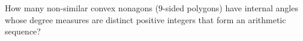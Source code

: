 How many non-similar convex nonagons ($9$-sided polygons) have internal angles whose degree measures are distinct positive integers that form an arithmetic sequence?
